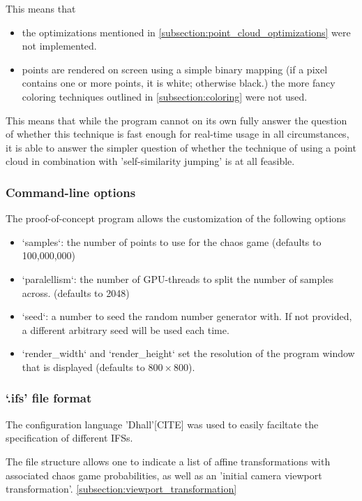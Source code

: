 \documentclass[11pt]{article}
\begin{document}
This means that 

\begin{itemize}
\item the optimizations mentioned in \autoref{subsection:point_cloud_optimizations} were not implemented.
\item points are rendered on screen using a simple binary mapping (if a pixel contains one or more points, it is white; otherwise black.)
the more fancy coloring techniques outlined in \autoref{subsection:coloring} were not used.
\end{itemize}

This means that while the program cannot on its own fully answer the question of whether
this technique is fast enough for real-time usage in all circumstances,
it is able to answer the simpler question of whether the technique of using a point cloud
in combination with 'self-similarity jumping' is at all feasible.

\subsubsection{Command-line options}
\label{sec:org6761dcb}

The proof-of-concept program allows the customization of the following options

\begin{itemize}
\item `samples`: the number of points to use for the chaos game (defaults to 100,000,000)
\item `paralellism`: the number of GPU-threads to split the number of samples across. (defaults to 2048)
\item `seed`: a number to seed the random number generator with. If not provided, a different arbitrary seed will be used each time.
\item `render\_width` and `render\_height` set the resolution of the program window that is displayed (defaults to \(800 \times 800\)).
\end{itemize}

\subsubsection{`.ifs' file format}
\label{sec:org81f9728}

The configuration language 'Dhall'[CITE] was used to 
easily faciltate the specification of different IFSs.

The file structure allows one to indicate a list of affine transformations with associated chaos game probabilities,
as well as an 'initial camera viewport transformation'. \autoref{subsection:viewport_transformation}
\end{document}
